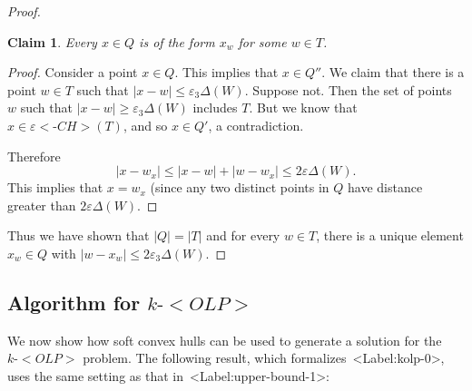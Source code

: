 \documentclass[11pt,letterpaper]{article}
\def\mathsf#1{<#1>}%
\def\xspace{}%
\def\Cref#1{<Label:#1>}%
\newtheorem{claim}[theorem]{Claim}
\theoremstyle{definition}
\theoremstyle{remark}
\newcommand{\dia}{\Delta}
\newcommand{\ech}{{\varepsilon{{\mathsf{\mbox{-}CH}}}}}
\newcommand{\olp}{{\mathsf {OLP}}\xspace}
\newcommand{\kolp}{k\mbox{-}\olp}
\begin{document}
\begin{proof}
\begin{claim}
\label{cl:final}
Every $x \in Q$ is of the form $x_w$ for some $w \in T$. 
\end{claim}
\begin{proof}
Consider a point $x \in Q$. This implies that $x \in Q''$. We claim that there is a point $w \in T$ such that $|x-w| \leq \varepsilon_3 \dia(W)$. Suppose not. Then the set of points $w$ such that $|x-w| \geq \varepsilon_3 \dia(W)$ includes $T$. But we know that $x \in \ech(T)$, and so $x \in Q'$, a contradiction. 

Therefore $$|x - w_x| \leq |x- w| + |w-w_x| \leq  2\varepsilon \dia(W). $$
This implies that $x=w_x$ (since any two distinct points in $Q$ have distance greater than $2\varepsilon \dia(W)$. 
\end{proof}

Thus we have shown that $|Q|=|T|$ and for every $w \in T$, there is a unique element $x_w \in Q$ with $|w-x_w| \leq 2 \varepsilon_3 \dia(W)$.
\end{proof}



\subsection{Algorithm for $\kolp$}
We now show how soft convex hulls can be used to generate a solution for the $\kolp$ problem. The following result, which formalizes~\Cref{kolp-0}, uses the same setting as that in~\Cref{upper-bound-1}:
\end{document}
